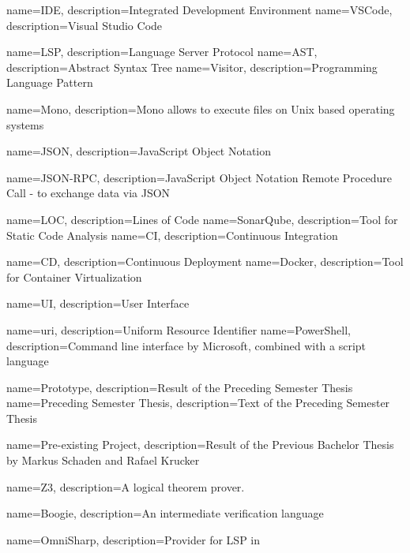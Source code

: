 {
	name=IDE,
	description={Integrated Development Environment}
}
{
	name=VSCode,
	description={Visual Studio Code}
}

{
	name=LSP,
	description={Language Server Protocol}
}
{
	name=AST,
	description={Abstract Syntax Tree}
}
{
	name=Visitor,
	description={Programming Language Pattern}
}

{
	name=Mono,
	description={Mono allows to execute  files on Unix based operating systems}
}

{
	name=JSON,
	description={JavaScript Object Notation}
}

{
	name=JSON-RPC,
	description={JavaScript Object Notation Remote Procedure Call - to exchange data via JSON}
}

{
	name=LOC,
	description={Lines of Code}
}
{
	name=SonarQube,
	description={Tool for Static Code Analysis}
}
{
	name=CI,
	description={Continuous Integration}
}

{
	name=CD,
	description={Continuous Deployment}
}
{
	name=Docker,
	description={Tool for Container Virtualization}
}

{
	name=UI,
	description={User Interface}
}

{
	name=uri,
	description={Uniform Resource Identifier} 
}
{
	name=PowerShell,
	description={Command line interface by Microsoft, combined with a script language}
}

{
	name=Prototype,
	description={Result of the Preceding Semester Thesis}
}
{
	name=Preceding Semester Thesis,
	description={Text of the Preceding Semester Thesis}
}

{
	name=Pre-existing Project,
	description={Result of the Previous Bachelor Thesis by Markus Schaden and Rafael Krucker}
}

{
	name=Z3,
	description={A logical theorem prover.}
}

{
	name=Boogie,
	description={An intermediate verification language}
}

{
	name=OmniSharp,
	description={Provider for LSP in \Csharp}
}


